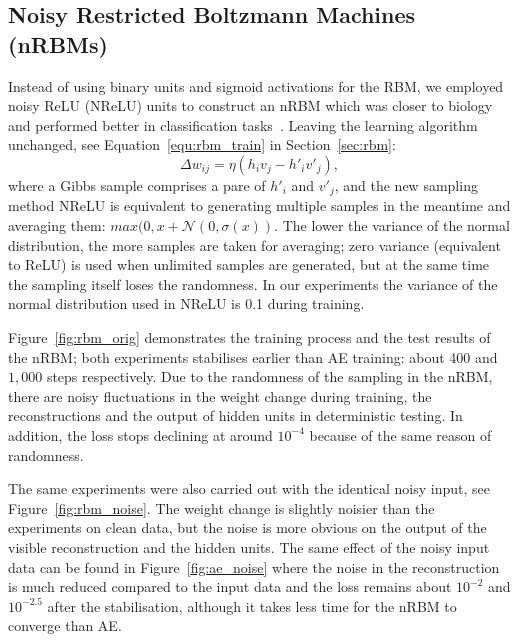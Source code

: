 \subsection{Noisy Restricted Boltzmann Machines (nRBMs)}
\label{subsec:exp_RBM}
Instead of using binary units and sigmoid activations for the RBM, we employed noisy ReLU (NReLU) units to construct an nRBM which was closer to biology and performed better in classification tasks~\citep{nair2010rectified}.
Leaving the learning algorithm unchanged, see Equation~\ref{equ:rbm_train} in Section~\ref{sec:rbm}:
\begin{equation}
\Delta w_{ij} = \eta (h_iv_j - h'_iv'_j),
\label{equ:rbm}
\end{equation} 
where a Gibbs sample comprises a pare of $h'_i$ and $v'_j$, and the new sampling method NReLU is equivalent to generating multiple samples in the meantime and averaging them: $max(0, x+\mathcal{N}(0, \sigma(x))$.
The lower the variance of the normal distribution, the more samples are taken for averaging;
zero variance (equivalent to ReLU) is used when unlimited samples are generated, but at the same time the sampling itself loses the randomness.
In our experiments the variance of the normal distribution used in NReLU is 0.1 during training.


Figure~\ref{fig:rbm_orig} demonstrates the training process and the test results of the nRBM; both experiments stabilises earlier than AE training: about 400 and $1,000$ steps respectively.
Due to the randomness of the sampling in the nRBM, there are noisy fluctuations in the weight change during training, the reconstructions and the output of hidden units in deterministic testing.
In addition, the loss stops declining at around $10^{-4}$ because of the same reason of randomness.

The same experiments were also carried out with the identical noisy input, see Figure~\ref{fig:rbm_noise}.
The weight change is slightly noisier than the experiments on clean data, but the noise is more obvious on the output of the visible reconstruction and the hidden units.
The same effect of the noisy input data can be found in Figure~\ref{fig:ae_noise} where the noise in the reconstruction is much reduced compared to the input data and the loss remains about $10^{-2}$ and $10^{-2.5}$ after the stabilisation, although it takes less time for the nRBM to converge than AE.


